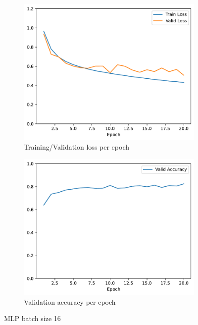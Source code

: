 \documentclass[11pt]{article}
\begin{document}
\begin{figure}[h!]
\centering
\begin{subfigure}{.5\textwidth}
  \centering
  \includegraphics[width=.9\linewidth]{plots/mlp-training-loss-batch-16-lr-0.1-epochs-20-hidden-200-dropout-0.0-l2-0.0-layers-2-act-relu-opt-sgd}
  \caption{Training/Validation loss per epoch}
\end{subfigure}%
\begin{subfigure}{.5\textwidth}
  \centering
  \includegraphics[width=.9\linewidth]{plots/mlp-validation-accuracy-batch-16-lr-0.1-epochs-20-hidden-200-dropout-0.0-l2-0.0-layers-2-act-relu-opt-sgd}
  \caption{Validation accuracy per epoch}
\end{subfigure}
\caption{MLP batch size 16}
\label{fig:MLP_batch_size_16}
\end{figure}
\end{document}
